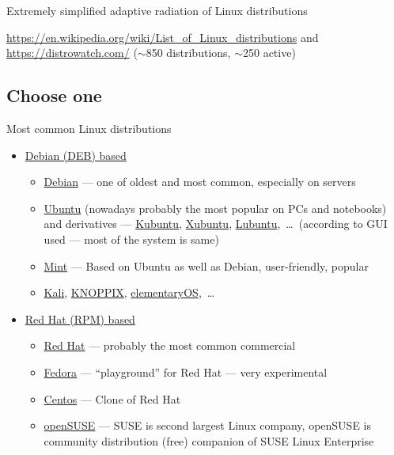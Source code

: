 \documentclass[compress, ucs, xelatex, 11pt, xcolor=svgnames, aspectratio=169,
	hyperref={
		bookmarks=true,
		unicode=true,
		colorlinks=true,
		pdftitle={Linux, command line and MetaCentrum},
		plainpages=false,
		pdfauthor={Vojtech Zeisek},
		pdfsubject={Course about use of Linux command line, writing shell scripts and using MetaCentrum of CESNET},
		pdfcreator={XeLaTeX},
		pdfkeywords={Linux, GNU, BASH, shell, command line, MetaCentrum},
		linkcolor=DarkRed, %
		anchorcolor=DarkBlue, %
		citecolor=Indigo, %
		filecolor=NavyBlue, %
		menucolor=DarkMagenta, %
		urlcolor=DarkBlue, %
		pdftex},
	url={hyphens, lowtilde} %
	]{beamer}
\renewcommand{\texttt}[1]{\colorbox{Beige}{{\ttfamily #1}}}
\begin{document}
\begin{frame}{Extremely simplified adaptive radiation of Linux distributions}
	\begin{center}
		\texttt{[image: linux\_fylogen\_2.png]}
	\end{center}
	\vfil
	\url{https://en.wikipedia.org/wiki/List_of_Linux_distributions} and \url{https://distrowatch.com/} ($\sim$850 distributions, $\sim$250 active)
	\vfill
\end{frame}

\subsection{Choose one}

\begin{frame}{Most common Linux distributions}
	\begin{itemize}
		\item \href{https://distrowatch.com/search.php?package=DEB}{Debian (DEB) based}
		\begin{itemize}
			\item \href{https://www.debian.org/}{Debian} --- one of oldest and most common, especially on servers
			\item \href{https://ubuntu.com/}{Ubuntu} (nowadays probably the most popular on PCs and notebooks) and derivatives --- \href{https://kubuntu.org/}{Kubuntu}, \href{https://xubuntu.org/}{Xubuntu}, \href{https://lubuntu.net/}{Lubuntu},~\ldots~(according to GUI used --- most of the system is same)
			\item \href{https://linuxmint.com/}{Mint} --- Based on Ubuntu as well as Debian, user-friendly, popular
			\item \href{https://www.kali.org/}{Kali}, \href{https://knopper.net/knoppix/index-en.html}{KNOPPIX}, \href{https://elementary.io/}{elementaryOS},~\ldots
		\end{itemize}
		\item \href{https://distrowatch.com/search.php?package=RPM}{Red Hat (RPM) based}
		\begin{itemize}
			\item \href{https://www.redhat.com/}{Red Hat} --- probably the most common commercial
			\item \href{https://getfedora.org/}{Fedora} --- \enquote{playground} for Red Hat --- very experimental
			\item \href{https://www.centos.org/}{Centos} --- Clone of Red Hat
			\item \href{https://www.opensuse.org/}{openSUSE} --- SUSE is second largest Linux company, openSUSE is community distribution (free) companion of SUSE Linux Enterprise

\end{itemize}
\end{itemize}
\end{frame}
\end{document}

